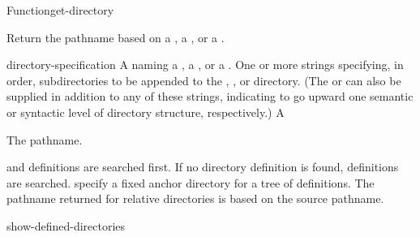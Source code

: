 \documentclass[10pt,twoside,english,pdftex]{article}
\begin{document}
\begin{functiondoc}{Function}{get-directory}{
    }
%

\fnsyntax 

\fnpurpose Return the pathname based on a , a
, or a .

\fnpackage {}

\fnmodule {}

\fnargs
\begin{args}{directory-specification}
\arg[name] A  naming a , a
, or a .
\arg[subdirectories] One or more strings specifying, in order, subdirectories
to be appended to the , , or
 directory. (The   or  can
also be supplied in addition to any of these strings, indicating to go upward
one semantic or syntactic level of directory structure, respectively.)
\arg[pathname] A 
\end{args}

\fnreturns The pathname.

\fnerrors
\relativedircircularity

\fndescription {} and  definitions are
searched first.  If no  directory definition is found,
 definitions are searched.   specify a
fixed anchor directory for a tree of  definitions.
The pathname returned for relative directories is based on the source pathname.

\begin{alsos}{show-defined-directories}
\end{alsos}

\fnexamples


\end{functiondoc}
\end{document}
